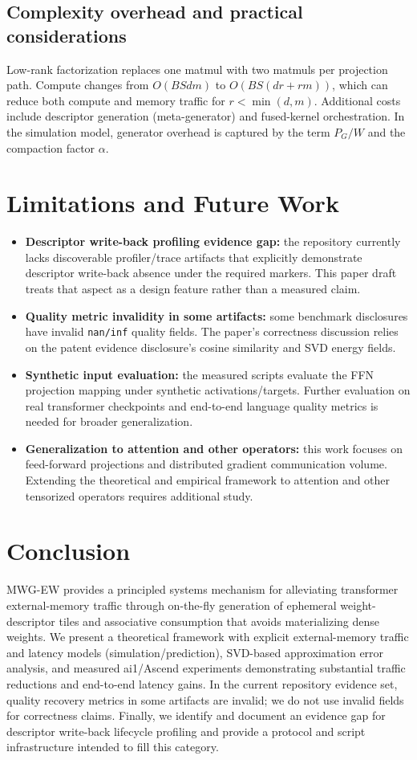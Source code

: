 \documentclass[11pt]{article}
\begin{document}
\subsection{Complexity overhead and practical considerations}
Low-rank factorization replaces one matmul with two matmuls per projection path. Compute changes from $O(BSd m)$ to $O(BS(d r + r m))$, which can reduce both compute and memory traffic for $r<\min(d,m)$. Additional costs include descriptor generation (meta-generator) and fused-kernel orchestration. In the simulation model, generator overhead is captured by the term $P_G/W$ and the compaction factor $\alpha$.

\section{Limitations and Future Work}
\begin{itemize}[leftmargin=1.2em]
  \item \textbf{Descriptor write-back profiling evidence gap:} the repository currently lacks discoverable profiler/trace artifacts that explicitly demonstrate descriptor write-back absence under the required markers. This paper draft treats that aspect as a design feature rather than a measured claim.
  \item \textbf{Quality metric invalidity in some artifacts:} some benchmark disclosures have invalid \texttt{nan/inf} quality fields. The paper’s correctness discussion relies on the patent evidence disclosure’s cosine similarity and SVD energy fields.
  \item \textbf{Synthetic input evaluation:} the measured scripts evaluate the FFN projection mapping under synthetic activations/targets. Further evaluation on real transformer checkpoints and end-to-end language quality metrics is needed for broader generalization.
  \item \textbf{Generalization to attention and other operators:} this work focuses on feed-forward projections and distributed gradient communication volume. Extending the theoretical and empirical framework to attention and other tensorized operators requires additional study.
\end{itemize}

\section{Conclusion}
MWG-EW provides a principled systems mechanism for alleviating transformer external-memory traffic through on-the-fly generation of ephemeral weight-descriptor tiles and associative consumption that avoids materializing dense weights. We present a theoretical framework with explicit external-memory traffic and latency models (simulation/prediction), SVD-based approximation error analysis, and measured ai1/Ascend experiments demonstrating substantial traffic reductions and end-to-end latency gains. In the current repository evidence set, quality recovery metrics in some artifacts are invalid; we do not use invalid fields for correctness claims. Finally, we identify and document an evidence gap for descriptor write-back lifecycle profiling and provide a protocol and script infrastructure intended to fill this category.
\end{document}
